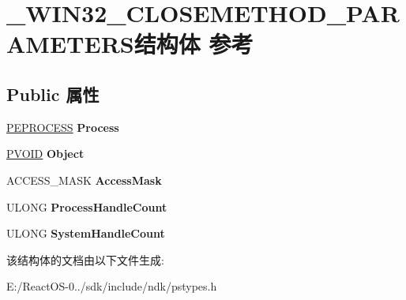 \hypertarget{struct___w_i_n32___c_l_o_s_e_m_e_t_h_o_d___p_a_r_a_m_e_t_e_r_s}{}\section{\+\_\+\+W\+I\+N32\+\_\+\+C\+L\+O\+S\+E\+M\+E\+T\+H\+O\+D\+\_\+\+P\+A\+R\+A\+M\+E\+T\+E\+R\+S结构体 参考}
\label{struct___w_i_n32___c_l_o_s_e_m_e_t_h_o_d___p_a_r_a_m_e_t_e_r_s}
\subsection*{Public 属性}
\begin{DoxyCompactItemize}
\item 
\mbox{\label{struct___w_i_n32___c_l_o_s_e_m_e_t_h_o_d___p_a_r_a_m_e_t_e_r_s_aa225934712bd909295332b5cd2390cdd}} 
\hyperlink{struct___e_p_r_o_c_e_s_s}{P\+E\+P\+R\+O\+C\+E\+SS} {\bfseries Process}
\item 
\mbox{\label{struct___w_i_n32___c_l_o_s_e_m_e_t_h_o_d___p_a_r_a_m_e_t_e_r_s_ac66c22309444ee761be3c45bf2d4f714}} 
\hyperlink{interfacevoid}{P\+V\+O\+ID} {\bfseries Object}
\item 
\mbox{\label{struct___w_i_n32___c_l_o_s_e_m_e_t_h_o_d___p_a_r_a_m_e_t_e_r_s_a14b099bd1065ed7a66948e636cf58ebc}} 
A\+C\+C\+E\+S\+S\+\_\+\+M\+A\+SK {\bfseries Access\+Mask}
\item 
\mbox{\label{struct___w_i_n32___c_l_o_s_e_m_e_t_h_o_d___p_a_r_a_m_e_t_e_r_s_aebb18360d78383f5ba89be7f5d87ed95}} 
U\+L\+O\+NG {\bfseries Process\+Handle\+Count}
\item 
\mbox{\label{struct___w_i_n32___c_l_o_s_e_m_e_t_h_o_d___p_a_r_a_m_e_t_e_r_s_a218d071db0c4e4870bf0b2c04eecc319}} 
U\+L\+O\+NG {\bfseries System\+Handle\+Count}
\end{DoxyCompactItemize}


该结构体的文档由以下文件生成\+:\begin{DoxyCompactItemize}
\item 
E\+:/\+React\+O\+S-\/0../sdk/include/ndk/pstypes.\+h\end{DoxyCompactItemize}
